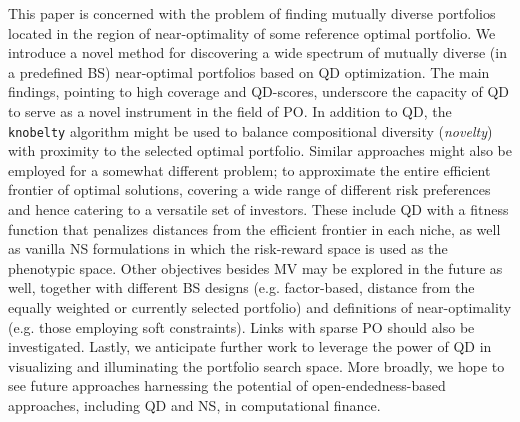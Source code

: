 This paper is concerned with the problem of finding mutually diverse portfolios located in the region of near-optimality of some reference optimal portfolio. We introduce a novel method for discovering a wide spectrum of mutually diverse (in a predefined BS) near-optimal portfolios based on QD optimization. The main findings, pointing to high coverage and QD-scores, underscore the capacity of QD to serve as a novel instrument in the field of PO. In addition to QD, the \verb|knobelty| algorithm \cite{kelly} might be used to balance compositional diversity (\emph{novelty}) with proximity to the selected optimal portfolio. Similar approaches might also be employed for a somewhat different problem; to approximate the entire efficient frontier of optimal solutions, covering a wide range of different risk preferences and hence catering to a versatile set of investors. These include QD with a fitness function that penalizes distances from the efficient frontier in each niche, as well as vanilla NS formulations in which the risk-reward space is used as the phenotypic space. Other objectives besides MV may be explored in the future as well, together with different BS designs (e.g. factor-based, distance from the equally weighted or currently selected portfolio) and definitions of near-optimality (e.g. those employing soft constraints). Links with sparse PO should also be investigated. Lastly, we anticipate further work to leverage the power of QD in visualizing and illuminating the portfolio search space. More broadly, we hope to see future approaches harnessing the potential of open-endedness-based approaches, including QD and NS, in computational finance.







